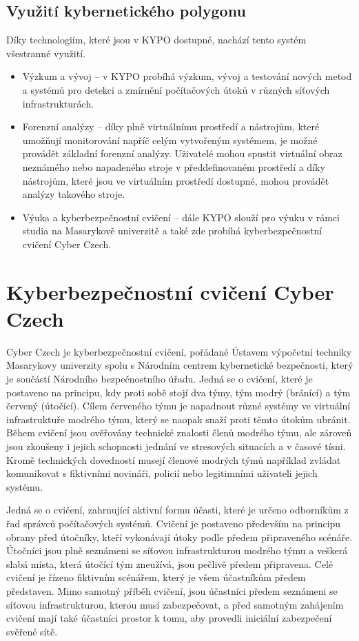 \documentclass[
  digital, %
  twoside, %
  table,   %
  lof,     %
  lot,     %
]{fithesis3}
\begin{document}
\subsection{Využití kybernetického polygonu}
Díky technologiím, které jsou v KYPO dostupné, nachází tento systém všestranné využití. 
\begin{itemize}
\item Výzkum a vývoj -- v KYPO probíhá výzkum, vývoj a testování nových metod a systémů pro detekci a zmírnění počítačových útoků v různých síťových infrastrukturách.
\item Forenzní analýzy -- díky plně virtuálnímu prostředí a nástrojům, které umožňují monitorování napříč celým vytvořeným systémem, je možné provádět základní forenzní analýzy. Uživatelé mohou spustit virtuální obraz neznámého nebo napadeného stroje v předdefinovaném prostředí a díky nástrojům, které jsou ve virtuálním prostředí dostupné, mohou provádět analýzy takového stroje. 
\item Výuka a kyberbezpečnostní cvičení -- dále KYPO slouží pro výuku v rámci studia na Masarykově univerzitě a také zde probíhá kyberbezpečnostní cvičení Cyber Czech.
\end{itemize}

\section{Kyberbezpečnostní cvičení Cyber Czech}
Cyber Czech je kyberbezpečnostní cvičení, pořádané Ústavem výpočetní techniky Masarykovy univerzity spolu s Národním centrem kybernetické bezpečnosti, který je součástí Národního bezpečnostního úřadu. Jedná se o cvičení, které je postaveno na principu, kdy proti sobě stojí dva týmy, tým modrý (bránící) a tým červený (útočící). Cílem červeného týmu je napadnout různé systémy ve virtuální infrastruktuře modrého týmu, který se naopak snaží proti těmto útokům ubránit. Během cvičení jsou ověřovány technické znalosti členů modrého týmu, ale zároveň jsou zkoušeny i jejich schopnosti jednání ve stresových situacích a v časové tísni. Kromě technických dovedností musejí členové modrých týmů například zvládat komunikovat s fiktivními novináři, policií nebo legitimními uživateli jejich systému.

Jedná se o cvičení, zahrnující aktivní formu účasti, které je určeno odborníkům z řad správců počítačových systémů. Cvičení je postaveno především na principu obrany před útočníky, kteří vykonávají útoky podle předem připraveného scénáře. Útočníci jsou plně seznámeni se síťovou infrastrukturou modrého týmu a veškerá slabá místa, která útočící tým zneužívá, jsou pečlivě předem připravena. Celé cvičení je řízeno fiktivním scénářem, který je všem účastníkům předem představen. Mimo samotný příběh cvičení, jsou účastníci předem seznámeni se síťovou infrastrukturou, kterou musí zabezpečovat, a před samotným zahájením cvičení mají také účastníci prostor k tomu, aby provedli iniciální zabezpečení svěřené sítě.
\end{document}
